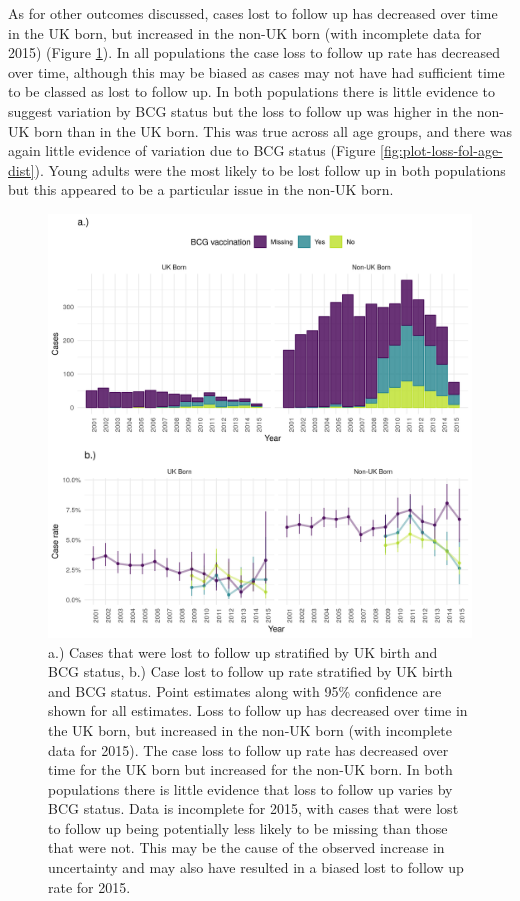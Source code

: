 \documentclass[11pt,twoside]{bristolthesis}
\begin{document}
  As for other outcomes discussed, cases lost to follow up has decreased over time in the UK born, but increased in the non-UK born (with incomplete data for 2015) (Figure \ref{fig:plot-loss-fol-case-rate}). In all populations the case loss to follow up rate has decreased over time, although this may be biased as cases may not have had sufficient time to be classed as lost to follow up. In both populations there is little evidence to suggest variation by BCG status but the loss to follow up was higher in the non-UK born than in the UK born. This was true across all age groups, and there was again little evidence of variation due to BCG status (Figure \ref{fig:plot-loss-fol-age-dist}). Young adults were the most likely to be lost follow up in both populations but this appeared to be a particular issue in the non-UK born.
  \begin{figure}
  
  {\centering \includegraphics[width=0.8\linewidth,]{chapters/tb-epi-england/figures/plot-loss-fol-case-rate} 
  
  }
  
  \caption[.) Cases that were lost to follow up stratified by UK birth and BCG status, b.) Case lost to follow up rate stratified by UK birth and BCG status.]{a.) Cases that were lost to follow up stratified by UK birth and BCG status, b.) Case lost to follow up rate stratified by UK birth and BCG status. Point estimates along with 95\% confidence are shown for all estimates. Loss to follow up has decreased over time in the UK born, but increased in the non-UK born (with incomplete data for 2015). The case loss to follow up rate has decreased over time for the UK born but increased for the non-UK born. In both populations there is little evidence that loss to follow up varies by BCG status. Data is incomplete for 2015, with cases that were lost to follow up being potentially less likely to be missing than those that were not. This may be the cause of the observed increase in uncertainty and may also have resulted in a biased lost to follow up rate for 2015.}\label{fig:plot-loss-fol-case-rate}
  \end{figure}
\end{document}
